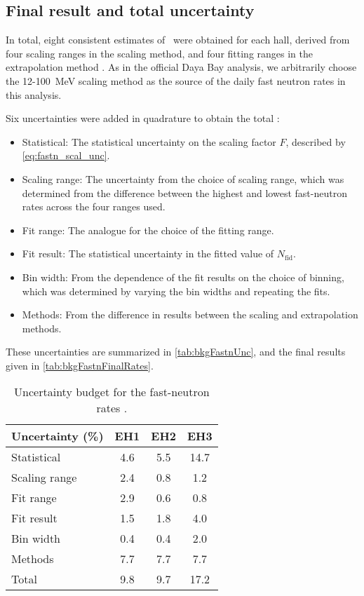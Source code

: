 \documentclass[../thesis.tex]{subfiles}
\begin{document}
\subsection{Final result and total uncertainty}
\label{sec:fastn_comb}

In total, eight consistent estimates of \rfn\ were obtained for each hall, derived from four scaling ranges in the scaling method, and four fitting ranges in the extrapolation method \cite{fastn}. As in the official Daya Bay analysis, we arbitrarily choose the 12-100~MeV scaling method as the source of the daily fast neutron rates in this analysis.

Six uncertainties were added in quadrature to obtain the total \cite{fastn}:
\begin{itemize}
\item Statistical: The statistical uncertainty on the scaling factor $F$, described by \autoref{eq:fastn_scal_unc}.
\item Scaling range: The uncertainty from the choice of scaling range, which was determined from the difference between the highest and lowest fast-neutron rates across the four ranges used.
\item Fit range: The analogue for the choice of the fitting range.
\item Fit result: The statistical uncertainty in the fitted value of $N_\mathrm{fid}$.
\item Bin width: From the dependence of the fit results on the choice of binning, which was determined by varying the bin widths and repeating the fits.
\item Methods: From the difference in results between the scaling and extrapolation methods.
\end{itemize}
These uncertainties are summarized in \autoref{tab:bkgFastnUnc}, and the final results given in \autoref{tab:bkgFastnFinalRates}.

\begin{table}[ht]
  \begin{tabular}{lccc}
    \toprule
    Uncertainty (\%)            & EH1  & EH2  & EH3 \\
    \midrule
    Statistical & 4.6 & 5.5 & 14.7 \\
    Scaling range & 2.4 & 0.8 & 1.2 \\
    Fit range & 2.9 & 0.6 & 0.8 \\
    Fit result & 1.5 & 1.8 & 4.0 \\
    Bin width & 0.4 & 0.4 & 2.0 \\
    Methods & 7.7 & 7.7 & 7.7 \\
    \midrule
    Total & 9.8 & 9.7 & 17.2 \\
    \bottomrule
  \end{tabular}
  \caption{Uncertainty budget for the fast-neutron rates \cite{fastn}.}
  \label{tab:bkgFastnUnc}
\end{table}
\end{document}
